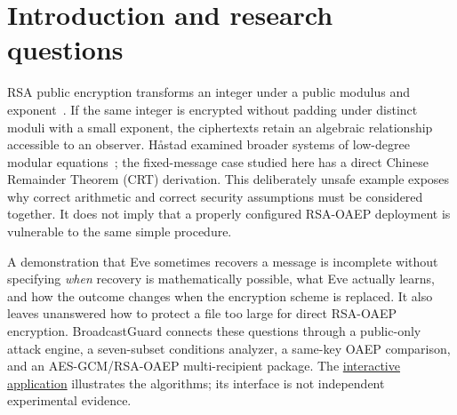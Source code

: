 \begin{abstract}
Sending one unpadded integer to multiple RSA recipients with public exponent $e=3$ can expose that integer without any private key. BroadcastGuard studies the exact CRT-and-cube-root condition, compares the same attack against RSA-OAEP under paired keys, and implements authenticated file sharing for several recipients. Twenty independent RSA key-set blocks produced 560 controlled subset observations, all consistent with the predicted integer-recovery condition. In 60 same-key comparisons, the tested attack recovered the textbook RSA message in 60 cases and the OAEP message in none; intended OAEP recipients decrypted in all 60. For a 1\,MiB hybrid-encrypted file and one recipient, JSON/Base64 serialization accounted for 93.78\% of the measured encryption workflow mean on one Windows machine. Eleven selected package-validity cases matched expected outcomes. The contribution is a reproducible educational integration and evidence-based analysis of established cryptographic methods, not a new primitive or a proof of universal security.
\end{abstract}

\begingroup
\small
\setlength{\parskip}{0pt}
\tableofcontents
\endgroup

\section{Introduction and research questions}
RSA public encryption transforms an integer under a public modulus and exponent~\cite{rivest1978method}. If the same integer is encrypted without padding under distinct moduli with a small exponent, the ciphertexts retain an algebraic relationship accessible to an observer. Håstad examined broader systems of low-degree modular equations~\cite{hastad1988solving}; the fixed-message case studied here has a direct Chinese Remainder Theorem (CRT) derivation. This deliberately unsafe example exposes why correct arithmetic and correct security assumptions must be considered together. It does not imply that a properly configured RSA-OAEP deployment is vulnerable to the same simple procedure.

A demonstration that Eve sometimes recovers a message is incomplete without specifying \emph{when} recovery is mathematically possible, what Eve actually learns, and how the outcome changes when the encryption scheme is replaced. It also leaves unanswered how to protect a file too large for direct RSA-OAEP encryption. BroadcastGuard connects these questions through a public-only attack engine, a seven-subset conditions analyzer, a same-key OAEP comparison, and an AES-GCM/RSA-OAEP multi-recipient package. The \href{https://broadcastguard-crypto.streamlit.app/}{interactive application} illustrates the algorithms; its interface is not independent experimental evidence.

